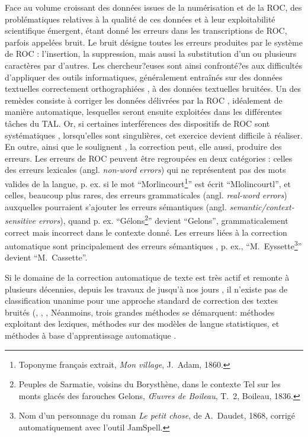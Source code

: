 Face au volume croissant des données issues de la numérisation et de la ROC, des problématiques relatives à la qualité de ces données et à leur exploitabilité scientifique émergent, étant donné 
les erreurs dans les transcriptions de ROC, parfois appelées bruit. Le bruit désigne toutes les erreurs produites par le système de ROC : l’insertion, la suppression, mais aussi la substitution d’un ou plusieurs caractères par d’autres. Les chercheur?euses sont ainsi confronté?es aux difficultés d’appliquer des outils informatiques, généralement entraînés sur des données textuelles correctement orthographiées \cite{DBLP:journals/corr/EshelCRMYL17}, à des données textuelles bruitées. Un des remèdes consiste à corriger les données délivrées par la ROC \cite{DBLP:conf/taln/SagotG14}, idéalement de manière automatique, lesquelles seront ensuite exploitées dans les différentes tâches du TAL. Or, si certaines interférences des dispositifs de ROC sont systématiques \cite{stanislawek-2019}, lorsqu’elles sont singulières, cet exercice devient difficile à réaliser. En outre, ainsi que le soulignent \cite{huynh}, la correction peut, elle aussi, produire des erreurs. 
Les erreurs de ROC peuvent être regroupées en deux catégories \cite{oger} : celles des erreurs lexicales (angl. \textit{non-word errors}) qui ne représentent pas des mots valides de la langue, p. ex. si le mot “Morlincourt\footnote{Toponyme français extrait, \textit{Mon village}, J.\ Adam, 1860.}” est écrit “Mlolincourtl”, et celles, beaucoup plus rares, des erreurs grammaticales (angl. \textit{real-word errors}) \cite{wisniewski} auxquelles pourraient s'ajouter les erreurs sémantiques (angl. \textit{semantic/context-sensitive errors}), quand p. ex. “Gélons\footnote{Peuples de Sarmatie, voisins du Borysthène, dans le contexte  \og{}Tel sur les monts glacés des farouches Gelons\fg{}, \textit{Œuvres de Boileau}, T.\ 2, Boileau, 1836.}” devient “Gelons”, grammaticalement correct mais incorrect dans le contexte donné. Les erreurs liées à la correction automatique sont principalement des erreurs sémantiques \cite{azmi}, p. ex., “M.\ Eyssette\footnote{Nom d’un personnage du roman \textit{Le petit chose}, de A.\ Daudet, 1868, corrigé automatiquement avec l'outil JamSpell.}” devient “M.\ Cassette”. 

Si le domaine de la correction automatique de texte est très actif et remonte à plusieurs décennies, depuis les travaux de \cite{damerau} jusqu’à nos jours \cite{nguyen2021}, il n’existe pas de classification unanime pour une approche standard de correction des textes bruités (\cite{DBLP:journals/corr/abs-1203-5255}, \cite{dumasmilneedwards:tel-01562039}, \cite{Nguyen-2020}, %
Néanmoins, trois grandes méthodes se démarquent: méthodes exploitant des lexiques, méthodes sur des modèles de langue statistiques, et méthodes à base d’apprentissage automatique \cite{petkovic2022impact}. 

